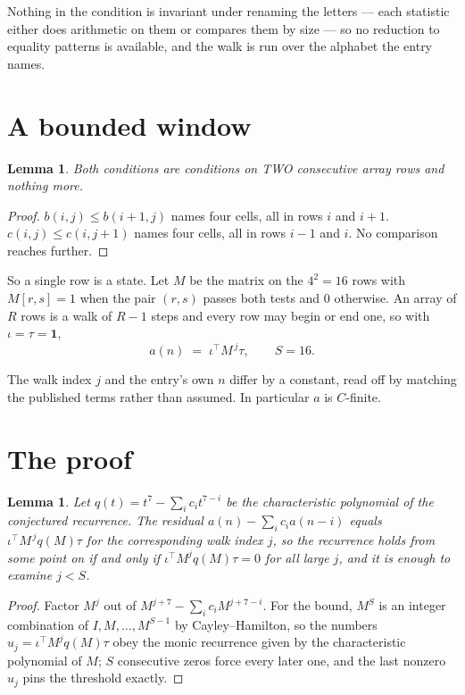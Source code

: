 \documentclass[11pt,a4paper]{article}
\theoremstyle{plain}
\newtheorem{lemma}[theorem]{Lemma}
\theoremstyle{definition}
\begin{document}
Nothing in the condition is invariant under renaming the letters --- each statistic either does
arithmetic on them or compares them by size --- so no reduction to equality patterns is
available, and the walk is run over the alphabet the entry names.

\section{A bounded window}

\begin{lemma}\label{lem:win}
Both conditions are conditions on TWO consecutive array rows and nothing more.
\end{lemma}

\begin{proof}
$b(i,j)\le b(i{+}1,j)$ names four cells, all in rows $i$ and $i+1$. $c(i,j)\le c(i,j{+}1)$
names four cells, all in rows $i-1$ and $i$. No comparison reaches further.
\end{proof}

So a single row is a state. Let $M$ be the matrix on the $4^{2}=16$ rows with
$M[r,s]=1$ when the pair $(r,s)$ passes both tests and $0$ otherwise. An array of $R$ rows is a
walk of $R-1$ steps and every row may begin or end one, so with $\iota=\tau=\mathbf{1}$,
\[
a(n)\;=\;\iota^{\!\top}M^{\,j}\tau ,\qquad S=16.
\]

The walk index $j$ and the entry's own $n$ differ by a constant, read off by matching the
published terms rather than assumed. In particular $a$ is $C$-finite.

\section{The proof}

\begin{lemma}\label{lem:crit}
Let $q(t)=t^{7}-\sum_i c_it^{7-i}$ be the characteristic polynomial of the
conjectured recurrence. The residual $a(n)-\sum_ic_ia(n-i)$ equals
$\iota^{\!\top}M^{\,j}q(M)\tau$ for the corresponding walk index $j$, so the recurrence
holds from some point on if and only if $\iota^{\!\top}M^{j}q(M)\tau=0$ for all large $j$,
and it is enough to examine $j<S$.
\end{lemma}

\begin{proof}
Factor $M^{j}$ out of $M^{j+7}-\sum_ic_iM^{j+7-i}$. For the bound, $M^{S}$
is an integer combination of $I,M,\dots,M^{S-1}$ by Cayley--Hamilton, so the numbers
$u_j=\iota^{\!\top}M^{j}q(M)\tau$ obey the monic recurrence given by the characteristic
polynomial of $M$; $S$ consecutive zeros force every later one, and the last nonzero $u_j$
pins the threshold exactly.
\end{proof}
\end{document}
